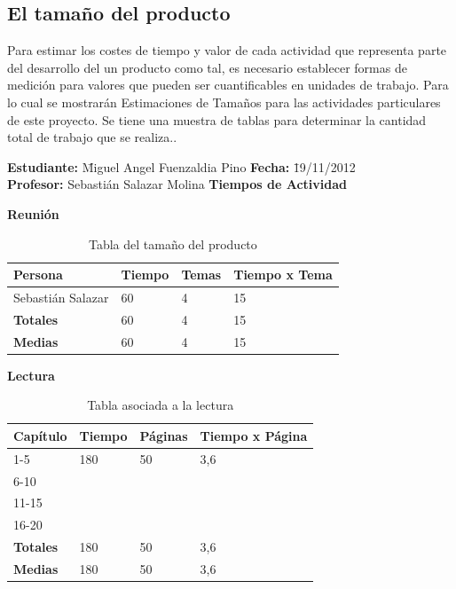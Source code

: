 \documentclass[a4paper,12pt,openany,oneside]{book}
\begin{document}
\subsection{El tamaño del producto}
Para estimar los costes de tiempo y valor de cada actividad que representa parte del desarrollo del un producto como tal, es necesario establecer formas de medición para valores que pueden ser cuantificables en unidades de trabajo. Para lo cual se mostrarán Estimaciones de Tamaños para las actividades particulares de este proyecto. Se tiene una muestra de tablas para determinar la cantidad total de trabajo que se realiza..
\newpage
\begin{table}
\begin{tabbing}
\textbf{Estudiante:} \= Miguel Angel Fuenzaldia Pino \= \textbf{Fecha:} \= 19/11/2012\\
\textbf{Profesor:} \> Sebastián Salazar Molina \> \textbf{Tiempos de Actividad} \>  \\
\end{tabbing}
\textbf{Reunión}\\
\begin{tabular}{| l | l | l | l |}
\hline
\textbf{Persona} & \textbf{Tiempo} & \textbf{Temas} & \textbf{Tiempo x Tema}\\
\hline
Sebastián Salazar & 60 & 4 & 15\\
\hline
\textbf{Totales} & 60 & 4 & 15 \\
\hline
\textbf{Medias} & 60 & 4 & 15 \\
\hline
\end{tabular}
\caption{Tabla del tamaño del producto}
\end{table}
\begin{table}
\textbf{Lectura}\\
\begin{tabular}{| l | l | l | l |}
\hline
\textbf{Capítulo} & \textbf{Tiempo} & \textbf{Páginas} & \textbf{Tiempo x Página}\\
\hline
1-5   & 180 & 50 & 3,6 \\
\hline
6-10  & & & \\
\hline
11-15 & & & \\
\hline
16-20 & & & \\
\hline
\textbf{Totales} & 180 & 50 & 3,6 \\
\hline
\textbf{Medias} & 180 & 50 & 3,6 \\
\hline
\end{tabular}
\caption{Tabla asociada a la lectura}
\end{table}
\end{document}
